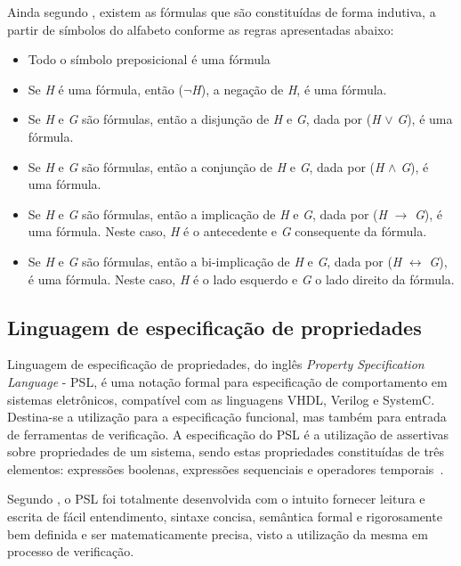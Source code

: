 Ainda segundo , existem as fórmulas que são constituídas de forma indutiva, a partir de símbolos do alfabeto conforme as regras apresentadas abaixo:
\begin{itemize}
\item Todo o símbolo preposicional é uma fórmula
\item Se \textit{H} é uma fórmula, então ($\neg$\textit{H}), a negação de \textit{H}, é uma fórmula.
\item Se \textit{H} e \textit{G} são fórmulas, então a disjunção de \textit{H} e \textit{G}, dada por (\textit{H} $\lor$ \textit{G}), é uma fórmula.
\item Se \textit{H} e \textit{G} são fórmulas, então a conjunção de \textit{H} e \textit{G}, dada por (\textit{H} $\land$ \textit{G}), é uma fórmula.
\item Se \textit{H} e \textit{G} são fórmulas, então a implicação de \textit{H} e \textit{G}, dada por (\textit{H} $\rightarrow$ \textit{G}), é uma fórmula. Neste caso, \textit{H} é o antecedente e \textit{G} consequente da fórmula.
\item Se \textit{H} e \textit{G} são fórmulas, então a bi-implicação de \textit{H} e \textit{G}, dada por (\textit{H} $\leftrightarrow$ \textit{G}), é uma fórmula. Neste caso, \textit{H} é o lado esquerdo e \textit{G} o lado direito da fórmula.
\end{itemize}


\subsection{Linguagem de especificação de propriedades}
Linguagem de especificação de propriedades, do inglês \textit{Property Specification Language} - PSL, é uma notação formal para especificação de comportamento em sistemas eletrônicos, compatível com as linguagens VHDL\cite{IEEEVHDLLanguage}, Verilog\cite{IEEEVerilogLanguage} e SystemC\cite{IEEESystemCLanguage}. Destina-se a utilização para a especificação funcional, mas também para entrada de ferramentas de verificação. A especificação do PSL é a utilização de assertivas sobre propriedades de um sistema, sendo estas propriedades constituídas de três elementos: expressões boolenas, expressões sequenciais e operadores temporais~\cite{IEEEPSL}.

\par
Segundo \cite{IEEEPSL}, o PSL foi totalmente desenvolvida com o intuito fornecer leitura e escrita de fácil entendimento, sintaxe concisa, semântica formal e rigorosamente bem definida e ser matematicamente precisa, visto a utilização da mesma em processo de verificação. 

